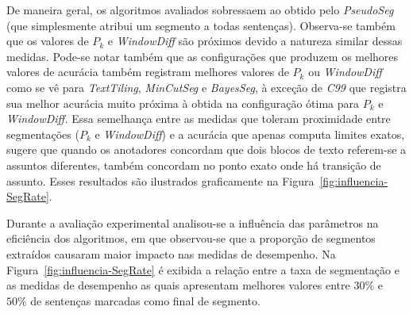 


De maneira geral, os algoritmos avaliados sobressaem ao obtido pelo \textit{PseudoSeg} (que simplesmente atribui um segmento a todas sentenças). Observa-se também que os valores de $P_k$ e \textit{WindowDiff} são próximos devido a natureza similar dessas medidas. Pode-se notar também que as configurações que produzem os melhores valores de acurácia também registram melhores valores de $P_k$ ou \textit{WindowDiff} como se vê para \textit{TextTiling}, \textit{MinCutSeg} e \textit{BayesSeg}, à exceção de \textit{C99} que registra sua melhor acurácia muito próxima à obtida na configuração ótima para $P_k$ e \textit{WindowDiff.} 
Essa semelhança entre as medidas que toleram proximidade entre segmentações ($P_k$  e \textit{WindowDiff}) e a acurácia que apenas computa limites exatos, sugere que quando os anotadores concordam que dois blocos de texto referem-se a assuntos diferentes, também concordam no ponto exato onde há transição de assunto.  Esses resultados são ilustrados graficamente na Figura~\ref{fig:influencia-SegRate}.



Durante a avaliação experimental analisou-se a influência das parâmetros na eficiência dos algoritmos, em que observou-se que a proporção de segmentos extraídos causaram maior impacto nas medidas de desempenho. Na Figura~\ref{fig:influencia-SegRate} é exibida a relação entre a taxa de segmentação e as medidas de desempenho as quais apresentam melhores valores entre $30\%$ e $50\%$ de sentenças marcadas como final de segmento.



